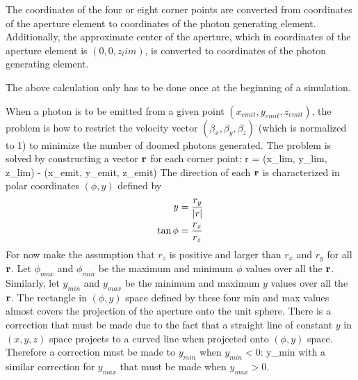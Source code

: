 The coordinates of the four or eight corner points are converted from
 coordinates of the aperture element to 
coordinates of the photon generating element. Additionally,
the approximate center of the aperture, which in 
coordinates of the aperture element is $(0, 0, z_lim)$, is converted
to  coordinates of the photon generating element.

The above calculation only has to be done once at the beginning of a
simulation.

When a photon is to be emitted from a given point $(x_{emit},
y_{emit}, z_{emit})$, the problem is how to restrict the velocity
vector $(\beta_x, \beta_y, \beta_z)$ (which is normalized to 1) to
minimize the number of doomed photons generated. The problem is solved
by constructing a vector ${\bf r}$ for each corner point:
\Begineq
  \Bf r = (x_{lim}, y_{lim}, z_{lim}) - (x_{emit}, y_{emit}, z_{emit})
\Endeq 
The direction of each ${\bf r}$ is characterized in polar coordinates
$(\phi, y)$ defined by
\begin{align}
  y &= \frac{r_y}{|r|} \nonumber \\
  \tan\phi &= \frac{r_x}{r_z} 
\end{align}
For now make the assumption that $r_z$ is positive and larger than
$r_x$ and $r_y$ for all ${\bf r}$.  Let $\phi_{max}$ and $\phi_{min}$ be
the maximum and minimum $\phi$ values over all the ${\bf r}$. Similarly,
let $y_{min}$ and $y_{max}$ be the minimum and maximum $y$ values over
all the ${\bf r}$. The rectangle in $(\phi, y)$ space defined by these
four min and max values almost covers the projection of the aperture
onto the unit sphere. There is a correction that must be made due to
the fact that a straight line of constant $y$ in $(x, y, z)$ space
projects to a curved line when projected onto $(\phi, y)$
space. Therefore a correction must be made to $y_{min}$ when $y_{min}
< 0$:
\Begineq
  y_{min} \rightarrow 
\Endeq
with a similar correction for $y_{max}$ that must be made when $y_{max} > 0$.


